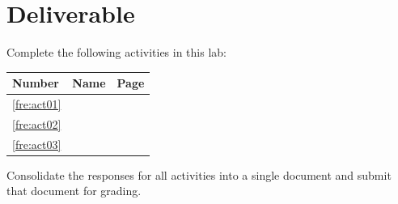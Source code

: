 \section{Deliverable}

Complete the following activities in this lab:

\begin{center}
  \begin{tabular}{lll}
    \hline 
    \textbf{Number} & \textbf{Name} & \textbf{Page} \\ 
    \hline 
    \ref{fre:act01} & \nameref{fre:act01} & \pageref{fre:act01} \\ 
    \ref{fre:act02} & \nameref{fre:act02} & \pageref{fre:act02} \\ 
    \ref{fre:act03} & \nameref{fre:act03} & \pageref{fre:act03} \\ 
    \hline 
  \end{tabular} 
\end{center}

Consolidate the responses for all activities into a single document and submit that document for grading.






